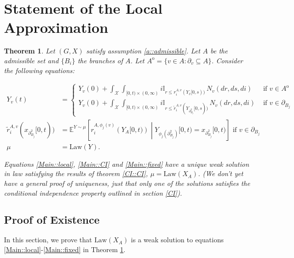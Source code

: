 \documentclass[12pt]{article}
\newcommand{\mb}{\mathbb}
\newcommand{\mc}{\mathcal}
\newcommand{\ov}{\overline}
\newcommand{\te}{\text}
\newcommand{\exmu}[2]{\mb{E}^{#1}\left[#2\right]}	%
\newcommand{\sta}{\mc{X}}							%
\newcommand{\neigh}[1]{\partial_{#1}}				%
\newcommand{\dneigh}[1]{\partial^2_{#1}}			%
\newcommand{\cl}[1]{\ov{#1}}						%
\newcommand{\Xf}{X}									%
\newcommand{\poiss}{N}								%
\newcommand{\rate}{r}								%
\newcommand{\poissv}[1]{_{#1}}						%
\newcommand{\vind}[1]{_{#1}}						%
\newcommand{\tme}[1]{(#1)}							%
\newcommand{\tmi}[1]{#1}							%
\newcommand{\stpara}[1]{_{#1}}						%
\newcommand{\gvpara}[2]{^{#1,#2}}					%
\newcommand{\Xg}{Y}									%
\newcommand{\brate}{\alt{\rate}}					%
\newcommand{\inte}[1]{{#1}^\mathrm{o}}				%
\newcommand{\alt}[1]{\tilde{#1}}					%
\newcommand{\law}{\te{Law}}							%
\newtheorem{thms}{Theorem}[section]
\begin{document}
\section{Statement of the Local Approximation}
\label{Main}


\begin{thms}
Let \((G,\Xf)\) satisfy assumption \ref{a::admissible}. Let \(A\) be the admissible set and \(\{B_i\}\) the branches of \(A\). Let \(\inte{A} = \{v \in A: \neigh{v} \subseteq A\}\). Consider the following equations:

\begin{align}
\Xg\vind{v}\tme{t} &= 
\begin{cases}
\Xg\vind{v}\tme{0} + \int_{\sta} \int_{[0,t)\times (0,\infty)} i\mb{I}_{r\leq \rate\gvpara{A}{v}\stpara{i}(\Xg\vind{\cl{v}}\tmi{[0,s)})}\,\poiss\poissv{v}(dr,ds,di) & \te{ if } v \in \inte{A}\\
\Xg\vind{v}\tme{0} + \int_{\sta} \int_{[0,t)\times (0,\infty)} i\mb{I}_{r\leq \brate\gvpara{A}{v}\stpara{i}(\Xg\vind{\dneigh{B_j}}\tmi{[0,s)})}\,\poiss\poissv{v}(dr,ds,di) &\te{ if } v \in \neigh{B_j}
\end{cases}\label{Main::local}\\
\brate\gvpara{A}{v}\stpara{i}(x_{\dneigh{B_j}}[0,t)) &= \exmu{\Xg \sim \mu}{\rate\gvpara{A}{\phi_j(v)}\stpara{i}\left(\Xg\vind{A}\tmi{[0,t)}\right)\middle|\Xg\vind{\phi_j(\dneigh{B_j})}\tmi{[0,t)} = x\vind{\dneigh{B_j}}\tmi{[0,t)}} \te{ if } v \in \neigh{B_j}\label{Main::CI}\\
\mu &= \law(\Xg).\label{Main::fixed}
\end{align}

Equations \eqref{Main::local}, \eqref{Main::CI} and \eqref{Main::fixed} have a unique weak solution in law satisfying the results of theorem \ref{CI::CI}, \(\mu = \law(\Xf\vind{A})\). (We don't yet have a general proof of uniqueness, just that only one of the solutions satisfies the conditional independence property outlined in section \ref{CI}).
\label{Main::Main}
\end{thms}

\subsection{Proof of Existence}
\label{Ex::Main}

In this section, we prove that \(\law(\Xf\vind{A})\) is a weak solution to equations \eqref{Main::local}-\eqref{Main::fixed} in Theorem \ref{Main::Main}.
\end{document}
